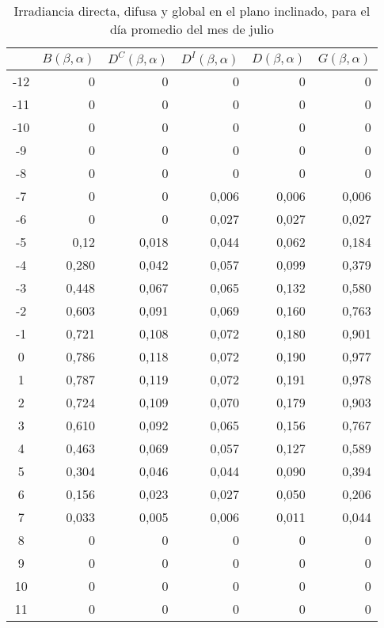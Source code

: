 \begin{table}[ht]
\centering
\begin{tabular}{|c|r|r|r|r|r|}
\hline
 &
  \multicolumn{1}{c|}{$B(\beta, \alpha)$} &
  \multicolumn{1}{c|}{$D^C(\beta, \alpha)$} &
  \multicolumn{1}{c|}{$D^I(\beta, \alpha)$} &
  \multicolumn{1}{c|}{$D(\beta, \alpha)$} &
  \multicolumn{1}{c|}{$G(\beta, \alpha)$} \\ \hline
-12 & 0     & 0     & 0     & 0     & 0     \\ \hline
-11 & 0     & 0     & 0     & 0     & 0     \\ \hline
-10 & 0     & 0     & 0     & 0     & 0     \\ \hline
-9  & 0     & 0     & 0     & 0     & 0     \\ \hline
-8  & 0     & 0     & 0     & 0     & 0     \\ \hline
-7  & 0     & 0     & 0,006 & 0,006 & 0,006 \\ \hline
-6  & 0     & 0     & 0,027 & 0,027 & 0,027 \\ \hline
-5  & 0,12  & 0,018 & 0,044 & 0,062 & 0,184 \\ \hline
-4  & 0,280 & 0,042 & 0,057 & 0,099 & 0,379 \\ \hline
-3  & 0,448 & 0,067 & 0,065 & 0,132 & 0,580 \\ \hline
-2  & 0,603 & 0,091 & 0,069 & 0,160 & 0,763 \\ \hline
-1  & 0,721 & 0,108 & 0,072 & 0,180 & 0,901 \\ \hline
0   & 0,786 & 0,118 & 0,072 & 0,190 & 0,977 \\ \hline
1   & 0,787 & 0,119 & 0,072 & 0,191 & 0,978 \\ \hline
2   & 0,724 & 0,109 & 0,070 & 0,179 & 0,903 \\ \hline
3   & 0,610 & 0,092 & 0,065 & 0,156 & 0,767 \\ \hline
4   & 0,463 & 0,069 & 0,057 & 0,127 & 0,589 \\ \hline
5   & 0,304 & 0,046 & 0,044 & 0,090 & 0,394 \\ \hline
6   & 0,156 & 0,023 & 0,027 & 0,050 & 0,206 \\ \hline
7   & 0,033 & 0,005 & 0,006 & 0,011 & 0,044 \\ \hline
8   & 0     & 0     & 0     & 0     & 0     \\ \hline
9   & 0     & 0     & 0     & 0     & 0     \\ \hline
10  & 0     & 0     & 0     & 0     & 0     \\ \hline
11  & 0     & 0     & 0     & 0     & 0     \\ \hline
\end{tabular}
\caption{Irradiancia directa, difusa y global en el plano inclinado, para el día promedio del mes de julio \label{tab:hourly_tilted_values}}
\end{table}
\newpage

